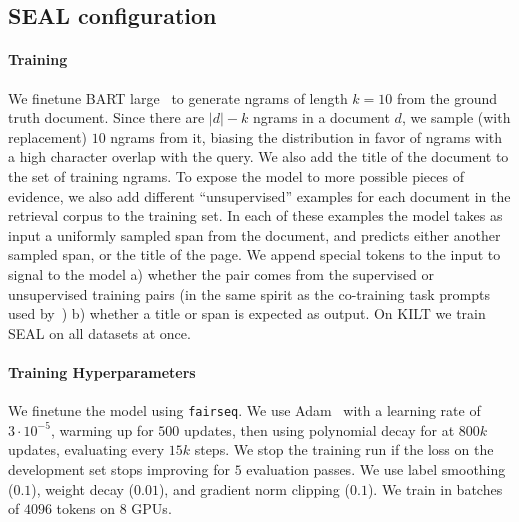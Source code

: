 \documentclass[11pt]{article}
\newcommand{\system}{\textsc{SEAL}}
\begin{document}
\subsection{\system{} configuration}

\paragraph{Training}
We finetune BART large~\citep{Lewis2019BARTDS} to generate ngrams of length $k=10$ from the ground truth document. Since there are $|d|-k$ ngrams in a document $d$, we sample (with replacement) $10$ ngrams from it, biasing the distribution in favor of ngrams with a high character overlap with the query. We also add the title of the document to the set of training ngrams. To expose the model to more possible pieces of evidence, we also add  different ``unsupervised'' examples for each document in the retrieval corpus to the training set. In each of these examples the model takes as input a uniformly sampled span from the document, and predicts either another sampled span, or the title of the page. 
We append special tokens to the input to signal to the model a) whether the pair comes from the supervised or unsupervised training pairs (in the same spirit as the co-training task prompts used by~\citet{tay-etal-2022-transformer}) b) whether a title or span is expected as output. On KILT we train \system{} on all datasets at once.

\paragraph{Training Hyperparameters}
We finetune the model using \texttt{fairseq}. We use Adam~\citep{DBLP:journals/corr/KingmaB14} with a learning rate of $3 \cdot 10^{-5}$, warming up for $500$ updates, then using polynomial decay for at $800k$ updates, evaluating every $15k$ steps. We stop the training run if the loss on the development set stops improving for $5$ evaluation passes. We use label smoothing ($0.1$), weight decay ($0.01$), and gradient norm clipping ($0.1$). We train in batches of $4096$ tokens on $8$ GPUs. 
\end{document}
